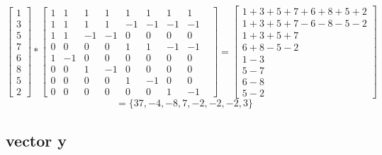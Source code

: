 \documentclass{article}
\begin{document}
\[ 
	\begin{bmatrix}
		1 \\
		3 \\
		5 \\
		7 \\
		6 \\
		8 \\
		5 \\
		2 
	\end{bmatrix}
		*  
\begin{bmatrix} 
	1&1&1&1&1&1&1&1 \\ 
	1&1&1&1&-1&-1&-1&-1 \\
	1&1&-1&-1&0&0&0&0& \\ 
	0&0&0&0&1&1&-1&-1 \\ 
	1&-1&0&0&0&0&0&0& \\
	0&0&1&-1&0&0&0&0 \\ 
	0&0&0&0&1&-1&0&0& \\ 
	0&0&0&0&0&0&1&-1 
\end{bmatrix}
=
\begin{bmatrix}
	1 + 3 + 5  + 7 + 6 + 8 + 5 + 2 \\
	1 + 3  + 5 + 7 - 6 - 8 -5 -2 \\
	1 + 3 + 5 + 7 \\
	6+ 8 -5 -2 \\
	1-3 \\
	5-7 \\
	6-8 \\
	5-2
\end{bmatrix}
\]
\[
	= \{ 37, -4, -8, 7, -2, -2, -2, 3 \}
\]





\subsection{vector y}
\end{document}
